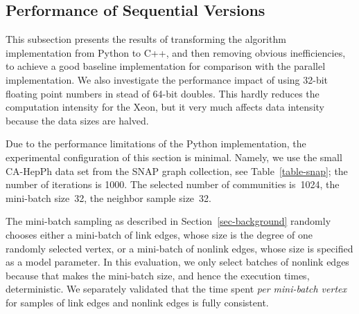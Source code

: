 \subsection{Performance of Sequential Versions}

This subsection presents the results of transforming the algorithm implementation
from Python to C++, and then removing obvious inefficiencies, to achieve a
good baseline implementation for comparison with the parallel implementation.
%
We also investigate the performance impact of using
32-bit floating point numbers in stead of 64-bit doubles.
This hardly reduces the computation intensity for the Xeon, but it very much
affects data intensity because the data sizes are halved.
%

Due to the performance limitations of the Python implementation, the
experimental configuration of this section is minimal.
%
Namely, we use the small CA-HepPh data set from the SNAP graph collection, see
Table~\ref{table-snap}; the number of
iterations is 1000.
The selected number of communities is~1024, the mini-batch size~32, the
neighbor sample size~32.

The mini-batch sampling as described in Section~\ref{sec-background} randomly
chooses either a mini-batch of link edges, whose size is the degree of one
randomly selected vertex, or a mini-batch of nonlink edges, whose size is
specified as a model parameter. In this evaluation, we only select batches
of nonlink edges because that makes the mini-batch size, and hence the
execution times, deterministic. We separately validated that the time spent
\textit{per mini-batch vertex} for samples of link edges and nonlink edges
is fully consistent.

